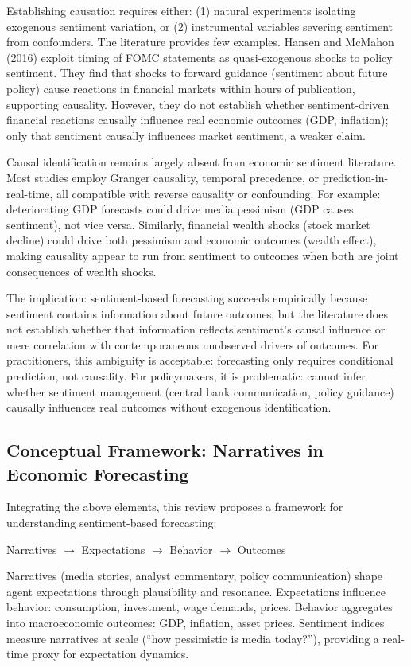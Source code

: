 \documentclass[11pt,twocolumn]{article}
\begin{document}
Establishing causation requires either: (1) natural experiments isolating exogenous sentiment variation, or (2) instrumental variables severing sentiment from confounders. The literature provides few examples. Hansen and McMahon (2016) exploit timing of FOMC statements as quasi-exogenous shocks to policy sentiment. They find that shocks to forward guidance (sentiment about future policy) cause reactions in financial markets within hours of publication, supporting causality. However, they do not establish whether sentiment-driven financial reactions causally influence real economic outcomes (GDP, inflation); only that sentiment causally influences market sentiment, a weaker claim.

Causal identification remains largely absent from economic sentiment literature. Most studies employ Granger causality, temporal precedence, or prediction-in-real-time, all compatible with reverse causality or confounding. For example: deteriorating GDP forecasts could drive media pessimism (GDP causes sentiment), not vice versa. Similarly, financial wealth shocks (stock market decline) could drive both pessimism and economic outcomes (wealth effect), making causality appear to run from sentiment to outcomes when both are joint consequences of wealth shocks.

The implication: sentiment-based forecasting succeeds empirically because sentiment contains information about future outcomes, but the literature does not establish whether that information reflects sentiment's causal influence or mere correlation with contemporaneous unobserved drivers of outcomes. For practitioners, this ambiguity is acceptable: forecasting only requires conditional prediction, not causality. For policymakers, it is problematic: cannot infer whether sentiment management (central bank communication, policy guidance) causally influences real outcomes without exogenous identification.

\subsection{Conceptual Framework: Narratives in Economic Forecasting}

Integrating the above elements, this review proposes a framework for understanding sentiment-based forecasting:

\noindent
Narratives $\rightarrow$ Expectations $\rightarrow$ Behavior $\rightarrow$ Outcomes

Narratives (media stories, analyst commentary, policy communication) shape agent expectations through plausibility and resonance. Expectations influence behavior: consumption, investment, wage demands, prices. Behavior aggregates into macroeconomic outcomes: GDP, inflation, asset prices. Sentiment indices measure narratives at scale (``how pessimistic is media today?''), providing a real-time proxy for expectation dynamics.
\end{document}
